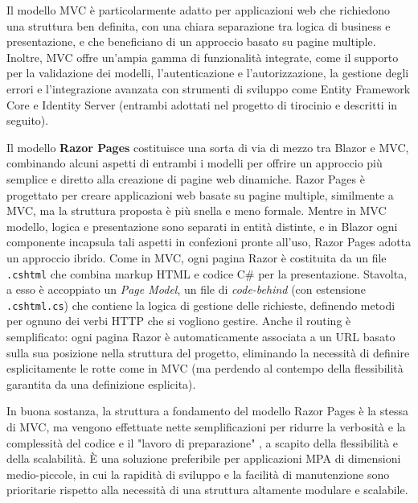 Il modello MVC è particolarmente adatto per applicazioni web che richiedono una struttura ben definita, con una chiara separazione tra logica di business e presentazione, e che beneficiano di un approccio basato su pagine multiple. Inoltre, MVC offre un'ampia gamma di funzionalità integrate, come il supporto per la validazione dei modelli, l'autenticazione e l'autorizzazione, la gestione degli errori e l'integrazione avanzata con strumenti di sviluppo come Entity Framework Core e Identity Server (entrambi adottati nel progetto di tirocinio e descritti in seguito).

Il modello \textbf{Razor Pages} costituisce una sorta di via di mezzo tra Blazor e MVC, combinando alcuni aspetti di entrambi i modelli per offrire un approccio più semplice e diretto alla creazione di pagine web dinamiche.
Razor Pages è progettato per creare applicazioni web basate su pagine multiple, similmente a MVC, ma la struttura proposta è più snella e meno formale.
Mentre in MVC modello, logica e presentazione sono separati in entità distinte, e in Blazor ogni componente incapsula tali aspetti in confezioni pronte all'uso, Razor Pages adotta un approccio ibrido.
Come in MVC, ogni pagina Razor è costituita da un file \texttt{.cshtml} che combina markup HTML e codice C\# per la presentazione. Stavolta, a esso è accoppiato un \emph{Page Model}, un file di \emph{code-behind} (con estensione \texttt{.cshtml.cs}) che contiene la logica di gestione delle richieste, definendo metodi per ognuno dei verbi HTTP che si vogliono gestire.
Anche il routing è semplificato: ogni pagina Razor è automaticamente associata a un URL basato sulla sua posizione nella struttura del progetto, eliminando la necessità di definire esplicitamente le rotte come in MVC (ma perdendo al contempo della flessibilità garantita da una definizione esplicita).

In buona sostanza, la struttura a fondamento del modello Razor Pages è la stessa di MVC, ma vengono effettuate nette semplificazioni per ridurre la verbosità e la complessità del codice e il "lavoro di preparazione" \cite[p.28]{Pro_ASP.NET}, a scapito della flessibilità e della scalabilità. È una soluzione preferibile per applicazioni MPA di dimensioni medio-piccole, in cui la rapidità di sviluppo e la facilità di manutenzione sono prioritarie rispetto alla necessità di una struttura altamente modulare e scalabile.

